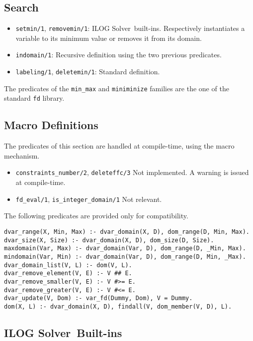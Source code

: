 \documentclass{article}
\newcommand{\solver}{ILOG Solver}
\begin{document}
\subsection{Search}
\begin{itemize}
 \item \verb"setmin/1", \verb"removemin/1": \solver\ built-ins. Respectively
 instantiates a variable to its minimum value or removes it from its domain.
 \item \verb"indomain/1": Recursive definition using the two previous predicates.
 \item \verb"labeling/1", \verb"deletemin/1": Standard definition.
\end{itemize}

The predicates of the \verb"min_max" and \verb"miniminize" families are the one
of the standard \verb"fd" library.

\subsection{Macro Definitions}
The predicates of this section are handled at compile-time, using the macro
mechanism.

\begin{itemize}
 \item \verb"constraints_number/2", \verb"deleteffc/3" Not implemented. A warning is issued
 at compile-time.
 \item \verb"fd_eval/1", \verb"is_integer_domain/1" Not relevant.
\end{itemize}

The following predicates are provided only for compatibility.
\begin{verbatim}
dvar_range(X, Min, Max) :- dvar_domain(X, D), dom_range(D, Min, Max).
dvar_size(X, Size) :- dvar_domain(X, D), dom_size(D, Size).
maxdomain(Var, Max) :- dvar_domain(Var, D), dom_range(D, _Min, Max).
mindomain(Var, Min) :- dvar_domain(Var, D), dom_range(D, Min, _Max).
dvar_domain_list(V, L) :- dom(V, L).
dvar_remove_element(V, E) :- V ## E.
dvar_remove_smaller(V, E) :- V #>= E.
dvar_remove_greater(V, E) :- V #<= E.
dvar_update(V, Dom) :- var_fd(Dummy, Dom), V = Dummy.
dom(X, L) :- dvar_domain(X, D), findall(V, dom_member(V, D), L).
\end{verbatim}

\subsection{\solver\ Built-ins}
\end{document}
